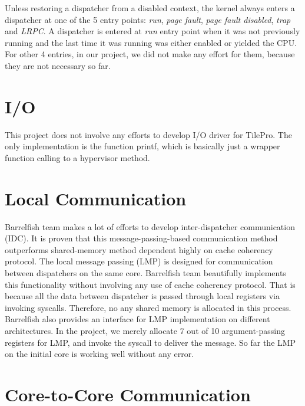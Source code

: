 \documentclass[a4paper,twoside]{report} %
\begin{document}
Unless restoring a dispatcher from a disabled context, the kernel always enters a dispatcher at one of the 5 entry points: \emph{run}, \emph{page fault}, \emph{page fault disabled}, \emph{trap} and \emph{LRPC}. A dispatcher is entered at \emph{run} entry point when it was not previously running and the last time it was running was either enabled or yielded the CPU. For other 4 entries, in our project, we did not make any effort for them, because they are not necessary so far.

\section{I/O}
This project does not involve any efforts to develop I/O driver for TilePro. The only implementation is the function printf, which is basically just a wrapper function calling to a hypervisor method.

\section{Local Communication}
Barrelfish team makes a lot of efforts to develop inter-dispatcher communication (IDC). It is proven that this message-passing-based communication method outperforms shared-memory method dependent highly on cache coherency protocol. The local message passing (LMP) is designed for communication between dispatchers on the same core. Barrelfish team beautifully implements this functionality without involving any use of cache coherency protocol. That is because all the data between dispatcher is passed through local registers via invoking syscalls. Therefore, no any shared memory is allocated in this process. Barrelfish also provides an interface for LMP implementation on different architectures. In the project, we merely allocate 7 out of 10 argument-passing registers for LMP, and invoke the syscall to deliver the message. So far the LMP on the initial core is working well without any error.

\section{Core-to-Core Communication}
\end{document}
